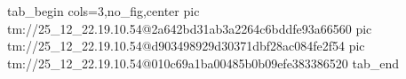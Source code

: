  
 
 
 
 

\qqSecOrig


\ifcmt
  tab_begin cols=3,no_fig,center
    pic tm://25_12_22.19.10.54@2a642bd31ab3a2264c6bddfe93a66560
    pic tm://25_12_22.19.10.54@d903498929d30371dbf28ac084fe2f54
    pic tm://25_12_22.19.10.54@010c69a1ba00485b0b09efe383386520
  tab_end
\fi

